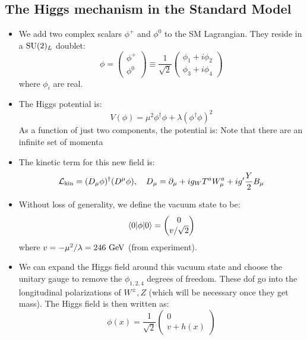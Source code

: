 \subsection{The Higgs mechanism in the Standard Model}
\begin{itemize}
  \item We add two complex scalars $\phi^+$ and $\phi^0$ to the SM Lagrangian. They reside in a $\operatorname{SU}(2)_L$ doublet:
  \begin{equation}
    \phi = \begin{pmatrix} \phi^+ \\ \phi^0 \end{pmatrix} \equiv \frac{1}{\sqrt2}\begin{pmatrix} \phi_1+i\phi_2 \\ \phi_3 + i\phi_4 \end{pmatrix}
  \end{equation}
  where $\phi_i$ are real. 
  \item The Higgs potential is:
  \begin{equation}
     V(\phi) = \mu^2 \phi^\dag \phi + \lambda (\phi^\dag \phi)^2
   \end{equation} 
   As a function of just two components, the potential is:
   Note that there are an infinite set of momenta
   \item The kinetic term for this new field is:
   \begin{equation}
     \mathcal{L}_\text{kin} = (D_\mu\phi)^\dag(D^\mu\phi), \quad D_\mu = \partial_\mu + i g_W T^a W^a_\mu + i g' \frac{Y}{2} B_\mu
   \end{equation}
   \item Without loss of generality, we define the vacuum state to be:
   \begin{equation}
     \langle 0 | \phi| 0 \rangle = \begin{pmatrix} 0 \\ v/\sqrt2 \end{pmatrix}
   \end{equation}
   where $v = -\mu^2/\lambda = 246~\text{GeV}$ (from experiment). 
   \item We can expand the Higgs field around this vacuum state and choose the unitary gauge to remove the $\phi_{1,2,4}$ degrees of freedom. These dof go into the longitudinal polarizations of $W^\pm,Z$ (which will be necessary once they get mass). The Higgs field is then written as:
   \begin{equation}
     \phi(x) = \frac{1}{\sqrt2} \begin{pmatrix} 0 \\ v+h(x) \end{pmatrix}

\end{equation}
\end{itemize}
